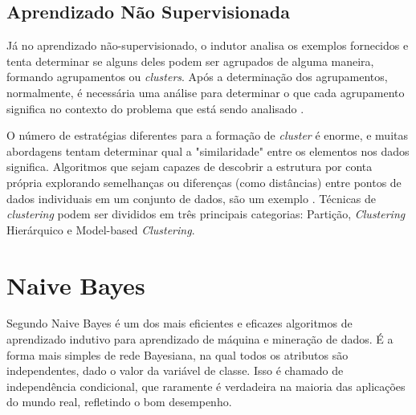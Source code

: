 \subsection{Aprendizado Não Supervisionada}

Já no aprendizado não-supervisionado, o indutor analisa os exemplos fornecidos e tenta determinar se alguns deles podem ser agrupados de alguma maneira, formando agrupamentos ou \textit{clusters}. Após a determinação dos agrupamentos, normalmente, é necessária uma análise para determinar o que cada agrupamento significa no contexto do problema que está sendo analisado \cite{monard2003}.



O número de estratégias diferentes para a formação de \textit{cluster} é enorme, e muitas abordagens tentam determinar qual a "similaridade" entre os elementos nos dados significa. Algoritmos que sejam capazes de descobrir a estrutura por conta própria explorando semelhanças ou diferenças (como distâncias) entre pontos de dados individuais em um conjunto de dados, são um exemplo \cite{cios2007}. Técnicas de \textit{clustering} podem ser divididos em três principais categorias: Partição, \textit{Clustering} Hierárquico e Model-based \textit{Clustering}.



\section{Naive Bayes}


Segundo \cite{zhang2004} Naive Bayes é um dos mais eficientes e eficazes algoritmos de aprendizado indutivo para aprendizado de máquina e mineração de dados. É a forma mais simples de rede Bayesiana, na qual todos os atributos são independentes, dado o valor da variável de classe. Isso é chamado de independência condicional, que raramente é verdadeira na maioria das aplicações do mundo real, refletindo o bom desempenho.



